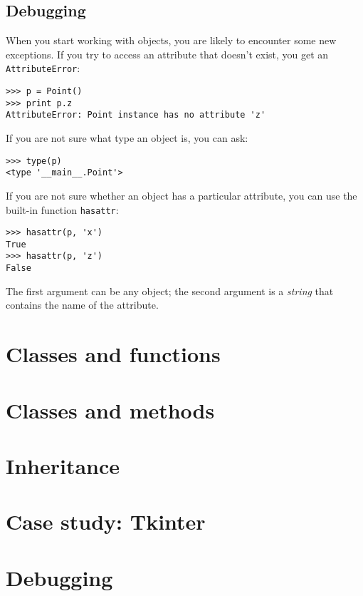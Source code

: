 \documentclass{article}
\begin{document}
\subsection{Debugging}
When you start working with objects, you are likely to encounter some new
exceptions. If you try to access an attribute that doesn’t exist, you get
an \verb|AttributeError|:
\begin{verbatim}
>>> p = Point()
>>> print p.z
AttributeError: Point instance has no attribute 'z'
\end{verbatim}
If you are not sure what type an object is, you can ask:
\begin{verbatim}
>>> type(p)
<type '__main__.Point'>
\end{verbatim}
If you are not sure whether an object has a particular attribute, you can
use the built-in function \verb|hasattr|:
\begin{verbatim}
>>> hasattr(p, 'x')
True
>>> hasattr(p, 'z')
False
\end{verbatim}
The first argument can be any object; the second argument is a
\emph{string} that contains the name of the attribute.
\newpage%
\section{Classes and functions}
\newpage%
\section{Classes and methods}
\newpage%
\section{Inheritance}
\newpage%
\section{Case study: Tkinter}
\newpage%
\section{Debugging}
\newpage%
\end{document}
